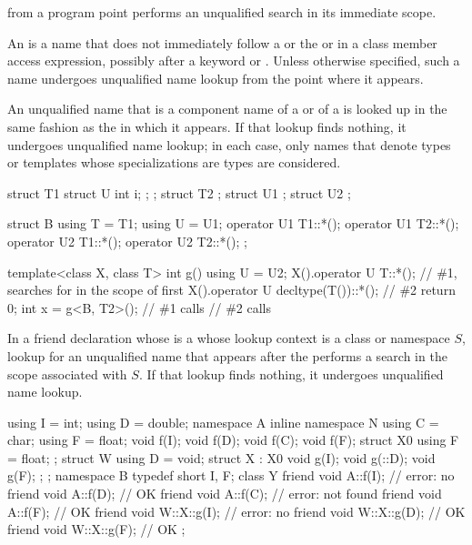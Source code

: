 \pnum
{}
from a program point performs an unqualified search in its immediate scope.

\pnum
An  is a name
that does not immediately follow a  or
the  or \tcode{->} in a class member access expression,
possibly after a  keyword or \tcode{\~}.
Unless otherwise specified,
such a name undergoes unqualified name lookup from the point where it appears.

\pnum
An unqualified name that is a component name of
a  or  of
a  is looked up in the same fashion
as the  in which it appears.
If that lookup finds nothing, it undergoes unqualified name lookup;
in each case, only names
that denote types or templates whose specializations are types are considered.
\begin{example}
\begin{codeblock}
struct T1 { struct U { int i; }; };
struct T2 { };
struct U1 {};
struct U2 {};

struct B {
  using T = T1;
  using U = U1;
  operator U1 T1::*();
  operator U1 T2::*();
  operator U2 T1::*();
  operator U2 T2::*();
};

template<class X, class T>
int g() {
  using U = U2;
  X().operator U T::*();                // \#1, searches for  in the scope of  first
  X().operator U decltype(T())::*();    // \#2
  return 0;
}
int x = g<B, T2>();                     // \#1 calls 
                                        // \#2 calls 
\end{codeblock}
\end{example}

\pnum
In a friend declaration 
whose  is a 
whose lookup context is a class or namespace $S$,
lookup for an unqualified name
that appears after the 
performs a search in the scope associated with $S$.
If that lookup finds nothing, it undergoes unqualified name lookup.
\begin{example}
\begin{codeblock}
using I = int;
using D = double;
namespace A {
  inline namespace N {using C = char; }
  using F = float;
  void f(I);
  void f(D);
  void f(C);
  void f(F);
}
struct X0 {using F = float; };
struct W {
  using D = void;
  struct X : X0 {
    void g(I);
    void g(::D);
    void g(F);
  };
};
namespace B {
  typedef short I, F;
  class Y {
    friend void A::f(I);        // error: no 
    friend void A::f(D);        // OK
    friend void A::f(C);        // error:  not found
    friend void A::f(F);        // OK
    friend void W::X::g(I);     // error: no 
    friend void W::X::g(D);     // OK
    friend void W::X::g(F);     // OK
  };
}
\end{codeblock}
\end{example}

